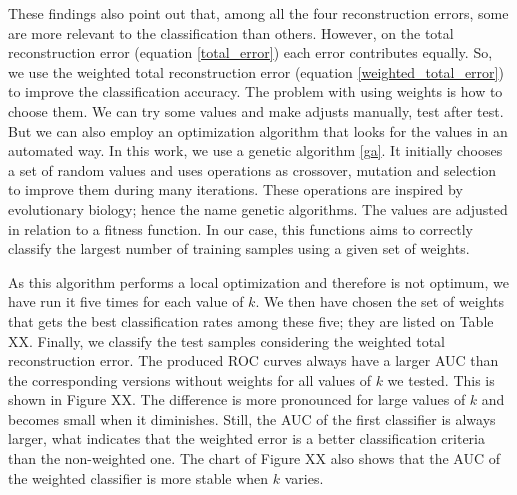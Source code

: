 \documentclass[10pt, conference, compsocconf]{IEEEtran}
\begin{document}
These findings also point out that, among all the four reconstruction errors, some are more relevant to the classification than others. However, on the total reconstruction error (equation \ref{total_error}) each error contributes equally. So, we use the weighted total reconstruction error (equation \ref{weighted_total_error}) to improve the classification accuracy. The problem with using weights is how to choose them. We can try some values and make adjusts manually, test after test. But we can also employ an optimization algorithm that looks for the values in an automated way. In this work, we use a genetic algorithm \ref{ga}. It initially chooses a set of random values and uses operations as crossover, mutation and selection to improve them during many iterations. These operations are inspired by evolutionary biology; hence the name genetic algorithms. The values are adjusted in relation to a fitness function. In our case, this functions aims to correctly classify the largest number of training samples using a given set of weights.

As this algorithm performs a local optimization and therefore is not optimum, we have run it five times for each value of $k$. We then have chosen the set of weights that gets the best classification rates among these five; they are listed on Table XX. Finally, we classify the test samples considering the weighted total reconstruction error. The produced ROC curves always have a larger AUC than the corresponding versions without weights for all values of $k$ we tested. This is shown in Figure XX. The difference is more pronounced for large values of $k$ and becomes small when it diminishes. Still, the AUC of the first classifier is always larger, what indicates that the weighted error is a better classification criteria than the non-weighted one. The chart of Figure XX also shows that the AUC of the weighted classifier is more stable when $k$ varies.



\end{document}

